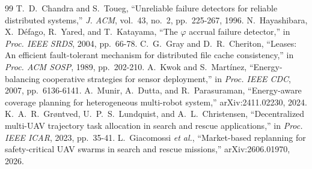 \documentclass[conference]{IEEEtran}
\begin{document}
\begin{thebibliography}{99}
 T.~D.~Chandra and S.~Toueg, ``Unreliable failure detectors for reliable distributed systems,'' \emph{J. ACM}, vol.~43, no.~2, pp.~225-267, 1996.
 N.~Hayashibara, X.~D\'efago, R.~Yared, and T.~Katayama, ``The $\varphi$ accrual failure detector,'' in \emph{Proc. IEEE SRDS}, 2004, pp.~66-78.
 C.~G.~Gray and D.~R.~Cheriton, ``Leases: An efficient fault-tolerant mechanism for distributed file cache consistency,'' in \emph{Proc. ACM SOSP}, 1989, pp.~202-210.
 A.~Kwok and S.~Mart\'inez, ``Energy-balancing cooperative strategies for sensor deployment,'' in \emph{Proc. IEEE CDC}, 2007, pp.~6136-6141.
 A.~Munir, A.~Dutta, and R.~Parasuraman, ``Energy-aware coverage planning for heterogeneous multi-robot system,'' arXiv:2411.02230, 2024.
 K.~A.~R.~Gr{\o}ntved, U.~P.~S.~Lundquist, and A.~L.~Christensen, ``Decentralized multi-UAV trajectory task allocation in search and rescue applications,'' in \emph{Proc. IEEE ICAR}, 2023, pp.~35-41.
 L.~Giacomossi \emph{et al.}, ``Market-based replanning for safety-critical UAV swarms in search and rescue missions,'' arXiv:2606.01970, 2026.
\end{thebibliography}\endgroup
\end{document}

